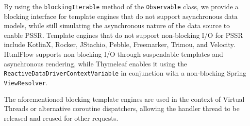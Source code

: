 By using the \texttt{blockingIterable} method of the \texttt{Observable} class,
we provide a blocking interface for template engines that do not support
asynchronous data models, while still simulating the asynchronous nature of the
data source to enable PSSR\@. Template engines that do not support non-blocking
I/O for PSSR include KotlinX, Rocker, JStachio, Pebble, Freemarker, Trimou, and
Velocity. HtmlFlow supports non-blocking I/O through suspendable templates and
asynchronous rendering, while Thymeleaf enables it using the
\texttt{ReactiveDataDriverContextVariable} in conjunction with a non-blocking
Spring \texttt{ViewResolver}.

The aforementioned blocking template engines are used in the context of Virtual
Threads or alternative coroutine dispatchers, allowing the handler thread to be
released and reused for other requests.

